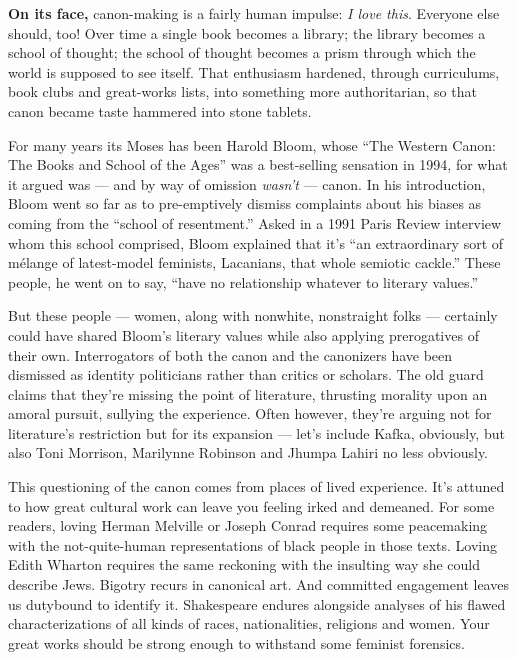 \textbf{On its face,} canon-making is a fairly human impulse: \emph{I
love this}. Everyone else should, too! Over time a single book becomes a
library; the library becomes a school of thought; the school of thought
becomes a prism through which the world is supposed to see itself. That
enthusiasm hardened, through curriculums, book clubs and great-works
lists, into something more authoritarian, so that canon became taste
hammered into stone tablets.

For many years its Moses has been Harold Bloom, whose ``The Western
Canon: The Books and School of the Ages'' was a best-selling sensation
in 1994, for what it argued was --- and by way of omission \emph{wasn't}
--- canon. In his introduction, Bloom went so far as to pre-emptively
dismiss complaints about his biases as coming from the ``school of
resentment.'' Asked in a 1991 Paris Review interview whom this school
comprised, Bloom explained that it's ``an extraordinary sort of mélange
of latest-model feminists, Lacanians, that whole semiotic cackle.''
These people, he went on to say, ``have no relationship whatever to
literary values.''

But these people --- women, along with nonwhite, nonstraight folks ---
certainly could have shared Bloom's literary values while also applying
prerogatives of their own. Interrogators of both the canon and the
canonizers have been dismissed as identity politicians rather than
critics or scholars. The old guard claims that they're missing the point
of literature, thrusting morality upon an amoral pursuit, sullying the
experience. Often however, they're arguing not for literature's
restriction but for its expansion --- let's include Kafka, obviously,
but also Toni Morrison, Marilynne Robinson and Jhumpa Lahiri no less
obviously.

This questioning of the canon comes from places of lived experience.
It's attuned to how great cultural work can leave you feeling irked and
demeaned. For some readers, loving Herman Melville or Joseph Conrad
requires some peacemaking with the not-quite-human representations of
black people in those texts. Loving Edith Wharton requires the same
reckoning with the insulting way she could describe Jews. Bigotry recurs
in canonical art. And committed engagement leaves us dutybound to
identify it. Shakespeare endures alongside analyses of his flawed
characterizations of all kinds of races, nationalities, religions and
women. Your great works should be strong enough to withstand some
feminist forensics.

